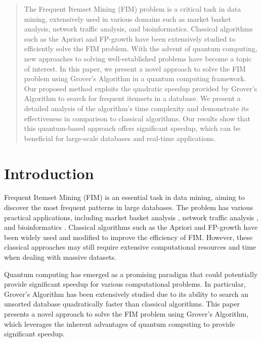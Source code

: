 
\begin{abstract}
The Frequent Itemset Mining (FIM) problem is a critical task in data mining, extensively used in various domains such as market basket analysis, network traffic analysis, and bioinformatics. Classical algorithms such as the Apriori and FP-growth have been extensively studied to efficiently solve the FIM problem. With the advent of quantum computing, new approaches to solving well-established problems have become a topic of interest. In this paper, we present a novel approach to solve the FIM problem using Grover's Algorithm in a quantum computing framework. Our proposed method exploits the quadratic speedup provided by Grover's Algorithm to search for frequent itemsets in a database. We present a detailed analysis of the algorithm's time complexity and demonstrate its effectiveness in comparison to classical algorithms. Our results show that this quantum-based approach offers significant speedup, which can be beneficial for large-scale databases and real-time applications.
\end{abstract}


\section{Introduction}

Frequent Itemset Mining (FIM) is an essential task in data mining, aiming to discover the most frequent patterns in large databases. The problem has various practical applications, including market basket analysis \cite{market_basket_analysis}, network traffic analysis \cite{network_traffic_analysis}, and bioinformatics \cite{bioinformatics}. Classical algorithms such as the Apriori \cite{apriori} and FP-growth \cite{fp_growth} have been widely used and modified to improve the efficiency of FIM. However, these classical approaches may still require extensive computational resources and time when dealing with massive datasets.

Quantum computing has emerged as a promising paradigm that could potentially provide significant speedup for various computational problems. In particular, Grover's Algorithm \cite{grover} has been extensively studied due to its ability to search an unsorted database quadratically faster than classical algorithms. This paper presents a novel approach to solve the FIM problem using Grover's Algorithm, which leverages the inherent advantages of quantum computing to provide significant speedup.

